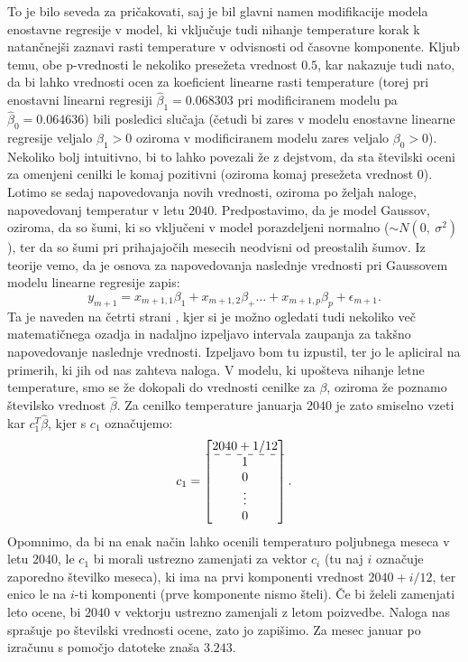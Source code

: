 \documentclass{article}
\begin{document}
To je bilo seveda za pričakovati, saj je bil glavni namen modifikacije modela enostavne regresije v model, ki vključuje tudi nihanje temperature korak k natančnejši zaznavi rasti temperature v odvisnosti od časovne komponente. 
Kljub temu, obe p-vrednosti le nekoliko presežeta vrednost $0.5$, kar nakazuje tudi nato, da bi lahko vrednosti ocen za koeficient linearne rasti temperature (torej pri enostavni linearni regresiji $\hat{\beta}_1 = 0.068303$ pri modificiranem modelu pa $\hat{\beta}_0 = 0.064636$) bili posledici slučaja (četudi bi zares v modelu enostavne linearne regresije veljalo $\beta_1 > 0$ oziroma v modificiranem modelu zares veljalo $\beta_0 > 0$). 
Nekoliko bolj intuitivno, bi to lahko povezali že z dejstvom, da sta številski oceni za omenjeni cenilki le komaj pozitivni (oziroma komaj presežeta vrednost $0$).
\newline
\newline
Lotimo se sedaj napovedovanja novih vrednosti, oziroma po željah naloge, napovedovanj temperatur v letu $2040$. Predpostavimo, da je model Gaussov, oziroma, da so šumi, ki so vključeni v model porazdeljeni normalno ($\sim N(0,~\sigma^2)$), ter da so šumi pri prihajajočih mesecih neodvisni od preostalih šumov. 
\newline
Iz teorije vemo, da je osnova za napovedovanja naslednje vrednosti pri Gaussovem modelu linearne regresije zapis:
$$
y_{m+1} = x_{m+1,1}\beta_1 + x_{m+1,2}\beta_ + \dots + x_{m+1,p}\beta_p + \epsilon_{m+1}.
$$
Ta je naveden na četrti strani \cite{lin_reg}, kjer si je možno ogledati tudi nekoliko več matematičnega ozadja in nadaljno izpeljavo intervala zaupanja za takšno napovedovanje naslednje vrednosti. 
Izpeljavo bom tu izpustil, ter jo le apliciral na primerih, ki jih od nas zahteva naloga.
\newline
V modelu, ki upošteva nihanje letne temperature, smo se že dokopali do vrednosti cenilke za $\beta$, oziroma že poznamo številsko vrednost $\hat{\beta}$. 
Za cenilko temperature januarja $2040$ je zato smiselno vzeti kar $c_1^T \hat{\beta}$, kjer s $c_1$ označujemo:
$$
    c_1= \begin{bmatrix}
        2040 + 1/12 \\
        \hdashline
        1\\
        0\\
        \vdots\\
        0
    \end{bmatrix}.
$$
Opomnimo, da bi na enak način lahko ocenili temperaturo poljubnega meseca v letu $2040$, le $c_1$ bi morali ustrezno zamenjati za vektor $c_i$ (tu naj $i$ označuje zaporedno številko meseca), ki ima na prvi komponenti vrednost $2040 + i/12$, ter enico le na $i$-ti komponenti (prve komponente nismo šteli).
Če bi želeli zamenjati leto ocene, bi $2040$ v vektorju ustrezno zamenjali z letom poizvedbe. 
Naloga nas sprašuje po številski vrednosti ocene, zato jo zapišimo.
Za mesec januar po izračunu s pomočjo datoteke znaša $3.243$.
\end{document}
